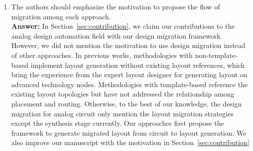 \begin{enumerate}
  \item The authors should emphasize the motivation to propose the flow of migration among each approach. \\
  {\bf Answer:} In Section~\ref{sec:contribution}, we claim our contributions to the analog design automation field with our design migration framework. However, we did not mention the motivation to use design migration instead of other approaches. In previous works, methodologies with non-template-based \cite{apnsi-pohung-dac07,GeneralRouter-CompEuro89,sensitAR-iccad90,arearouting-tcad1993,KOAN_ANAGRAMII-JSSC1991,AnalogRouteMatching-iccad2009,ppraic_Linfu_iccad2010,phLin-dac2008} implement layout generation without existing layout references, which bring the experience from the expert layout designer for generating layout on advanced technology nodes. Methodologies with template-based \cite{msc-bhattacharya-tcad06,ALP_YPWeng_iccad2011,ymYang-isqed2010,LAYGENII_TCAD13} reference the existing layout topologies but have not addressed the relationship among placement and routing. Otherwise, to the best of our knowledge, the design migration for analog circuit only mention the layout migration strategies except the synthesis stage currently. Our approaches first propose the framework to generate migrated layout from circuit to layout generation. We also improve our manuscript with the motivation in Section~\ref{sec:contribution}

\end{enumerate}